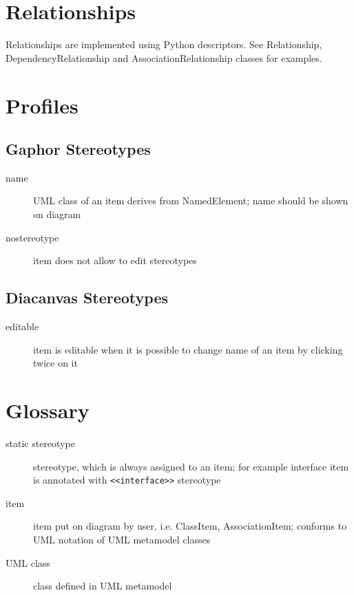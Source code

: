 \documentclass{book}
\newcommand{\rstereotype}[1]{\texttt{<<#1>>}}
\begin{document}


\chapter{Relationships}

Relationships are implemented using Python descriptors. See Relationship,
DependencyRelationship and AssociationRelationship classes for examples.

\chapter{Profiles}

\section{Gaphor Stereotypes}

\begin{description}
\item[name] UML class of an item derives from NamedElement; name
        should be shown on diagram
\item[nostereotype] item does not allow to edit stereotypes
\end{description}

\section{Diacanvas Stereotypes}

\begin{description}
\item[editable] item is editable when it is possible to change name of an
    item by clicking twice on it
\end{description}


\chapter{Glossary}

\begin{description}
\item[static stereotype] stereotype, which is always assigned
    to an item; for example interface item is annotated with
    \rstereotype{interface} stereotype

\item[item] item put on diagram by user, i.e. ClassItem, AssociationItem;
    conforms to UML notation of UML metamodel classes

\item[UML class] class defined in UML metamodel
\end{description}
\end{document}

